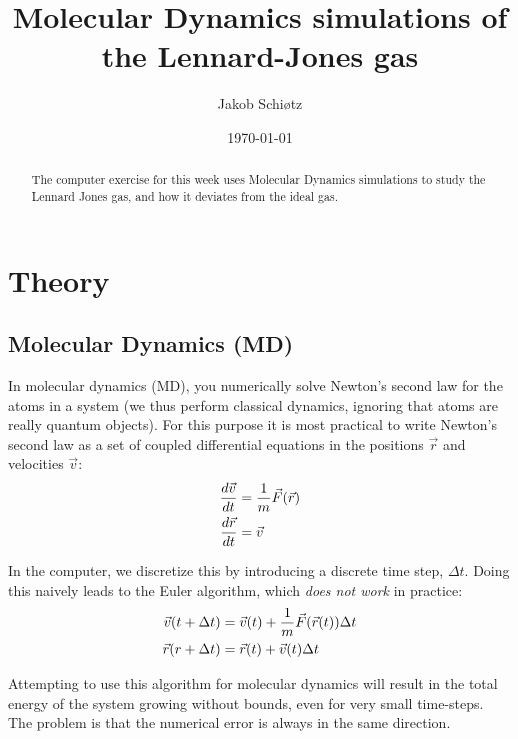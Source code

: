 \documentclass[a4paper,11pt]{article}
\begin{document}
\title{Molecular Dynamics simulations of the Lennard-Jones gas}
\author{Jakob Schiøtz}
\date{\today}
\maketitle

\begin{abstract}
  The computer exercise for this week uses Molecular Dynamics
  simulations to study the Lennard Jones gas, and how it deviates from
  the ideal gas.
\end{abstract}

\tableofcontents
\clearpage

\section{Theory}

\subsection{Molecular Dynamics (MD)}

In molecular dynamics (MD), you numerically solve Newton's second law
for the atoms in a system (we thus perform classical dynamics,
ignoring that atoms are really quantum objects).  For this purpose it
is most practical to write Newton's second law as a set of coupled
differential equations in the positions $\vec r$ and velocities $\vec
v$:
\begin{align}
  \label{eq:1}
  {d\vec v \over dt} &= {1 \over m} \vec F(\vec r) \\
  {d\vec r \over dt} &= \vec v 
\end{align}

In the computer, we discretize this by introducing a discrete time
step, $\Delta t$.  Doing this naively leads to the Euler algorithm, which
\emph{does not work} in practice:
\begin{align}
  \label{eq:Euler}
  \vec v(t + \Delta t) &= \vec v(t) + {1 \over m} \vec F(\vec r(t))
                         \Delta t\\
  \vec r(r + \Delta t) &= \vec r(t) + \vec v(t) \Delta t
\end{align}

Attempting to use this algorithm for molecular dynamics will result in
the total energy of the system growing without bounds, even for very
small time-steps.  The problem is that the numerical error is always
in the same direction.
\end{document}
